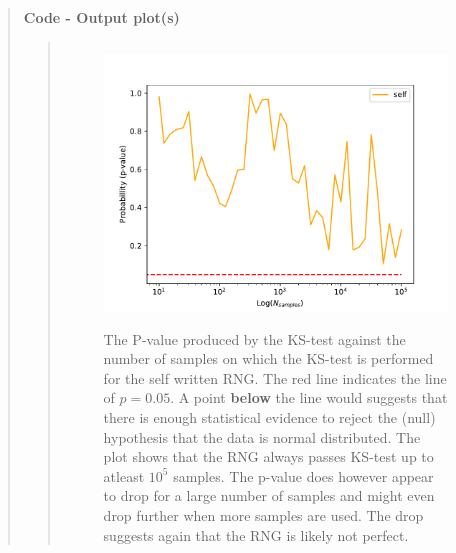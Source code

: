 \begin{quote}
\textbf{Code - Output plot(s)}
\begin{quote}
\begin{figure}[!ht]
\centering
\includegraphics[width=12cm, height=7.5cm]{./Plots/1_plot_ks_test_self.pdf}
\caption{The P-value produced by the KS-test against the number of samples on which the KS-test is performed for the self written RNG. The red line indicates the line of $ p = 0.05$. A point \textbf{below} the line would suggests that there is enough statistical evidence to reject the (null) hypothesis that the data is normal distributed. The plot shows that the RNG always passes KS-test up to atleast $10^5$ samples. The p-value  does however appear to drop for a large number of samples and might even drop further when more samples are used. The drop suggests again that the RNG is likely not perfect.}
\end{figure}


\end{quote}
\end{quote}
